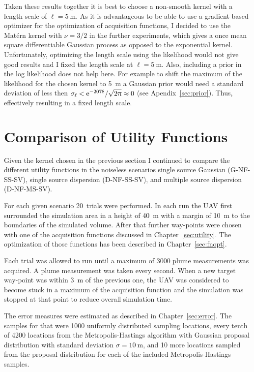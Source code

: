 Taken these results together it is best to choose a non-smooth kernel with 
a length scale of $\ell = \SI{5}{\meter}$. As it is advantageous to be able to 
use a gradient based optimizer for the optimization of acquisition functions, 
I decided to use the Matérn kernel with $\nu = 3/2$ in the further experiments, 
which gives a once mean square differentiable Gaussian process as opposed to the 
exponential kernel. Unfortunately, optimizing the length scale using the 
likelihood would not give good results and I fixed the length scale at $\ell 
= \SI{5}{\meter}$. Also, including a prior in the log likelihood does not help 
here. For example to shift the maximum of the likelihood for the chosen kernel 
to \SI{5}{\meter} a Gaussian prior would need a standard deviation of less then 
$\sigma_{\ell} < \mathrm{e}^{-2078} / \sqrt{2\uppi} \approx 0$ (see 
Apendix~\ref{sec:prior}).  Thus, effectively resulting in a fixed length scale.

\section{Comparison of Utility Functions}\label{sec:cmputility}
Given the kernel chosen in the previous section I continued to compare the 
different utility functions in the noiseless scenarios single source Gaussian 
(G-NF-SS-SV), single source dispersion (D-NF-SS-SV), and multiple source 
dispersion (D-NF-MS-SV).

For each given scenario 20~trials were performed. In each run the UAV first 
surrounded the simulation area in a height of \SI{40}{\meter} with a margin of 
\SI{10}{\meter} to the boundaries of the simulated volume. After that further 
way-points were chosen with one of the acquisition functions discussed in 
Chapter~\ref{sec:utility}. The optimization of those functions has been 
described in Chapter~\ref{sec:fnopt}.

Each trial was allowed to run until a maximum of \num{3000} plume measurements 
was acquired. A plume measurement was taken every second. When a new target 
way-point was within \SI{3}{\meter} of the previous one, the UAV was considered 
to become stuck in a maximum of the acquisition function and the simulation was 
stopped at that point to reduce overall simulation time.

The error measures were estimated as described in Chapter~\ref{sec:error}. The 
samples for that were 1000 uniformly distributed sampling locations, every tenth 
of 4200 locations from the Metropolis-Hastings algorithm with Gaussian proposal 
distribution with standard deviation $\sigma = \SI{10}{\meter}$, and 10 more 
locations sampled from the proposal distribution for each of the included 
Metropolis-Hastings samples.

